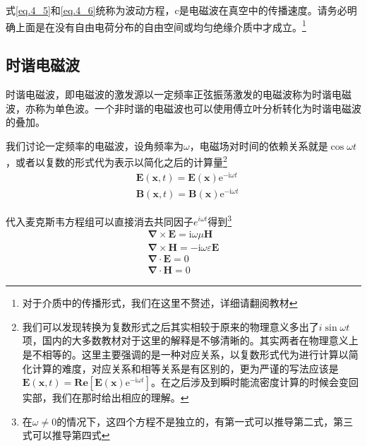         式\ref{eq.4_5}和\ref{eq.4_6}统称为波动方程，c是电磁波在真空中的传播速度。请务必明确上面是在没有自由电荷分布的自由空间或均匀绝缘介质中才成立。\footnote{对于介质中的传播形式，我们在这里不赘述，详细请翻阅教材}
    \subsection{时谐电磁波}
        时谐电磁波，即电磁波的激发源以一定频率正弦振荡激发的电磁波称为时谐电磁波，亦称为单色波。一个非时谐的电磁波也可以使用傅立叶分析转化为时谐电磁波的叠加。

        我们讨论一定频率的电磁波，设角频率为$\omega$，电磁场对时间的依赖关系就是$\cos \omega t$，或者以复数的形式代为表示以简化之后的计算量\footnote{我们可以发现转换为复数形式之后其实相较于原来的物理意义多出了$i \sin \omega t$项，国内的大多数教材对于这里的解释是不够清晰的。其实两者在物理意义上是不相等的。这里主要强调的是一种对应关系，以复数形式代为进行计算以简化计算的难度，对应关系和相等关系是有区别的，更为严谨的写法应该是$\boldsymbol{E}(\boldsymbol{x}, t)=\boldsymbol{Re}[\boldsymbol{E}(\boldsymbol{x}) \mathrm{e}^{-\mathrm{i} \omega t}]$。在之后涉及到瞬时能流密度计算的时候会变回实部，我们在那时给出相应的理解。   }
        \begin{equation}
            \begin{aligned}
            &\boldsymbol{E}(\boldsymbol{x}, t)=\boldsymbol{E}(\boldsymbol{x}) \mathrm{e}^{-\mathrm{i} \omega t} \\
            &\boldsymbol{B}(\boldsymbol{x}, t)=\boldsymbol{B}(\boldsymbol{x}) \mathrm{e}^{-\mathrm{i} \omega t}
            \end{aligned}
        \end{equation}

        代入麦克斯韦方程组可以直接消去共同因子$e^{i \omega t}$得到\footnote{在$\omega \neq 0$的情况下，这四个方程不是独立的，有第一式可以推导第二式，第三式可以推导第四式}
        \begin{equation}
            \begin{gathered}
            \boldsymbol{\nabla} \times \boldsymbol{E}=\mathrm{i} \omega \mu \boldsymbol{H} \\
            \boldsymbol{\nabla} \times \boldsymbol{H}=-\mathrm{i} \omega \varepsilon \boldsymbol{E} \\
            \boldsymbol{\nabla} \cdot \boldsymbol{E}=0 \\
            \boldsymbol{\nabla} \cdot \mathbf{H}=0
            \end{gathered}
            \end{equation}
        
